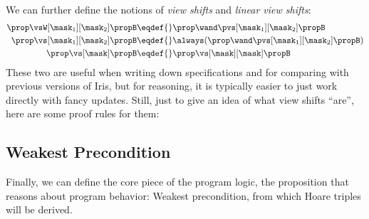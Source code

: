 We can further define the notions of \emph{view shifts} and \emph{linear view shifts}:
\begin{align*}
  \prop \vsW[\mask_1][\mask_2] \propB \eqdef{}& \prop \wand \pvs[\mask_1][\mask_2] \propB \\
  \prop \vs[\mask_1][\mask_2] \propB \eqdef{}& \always(\prop \wand \pvs[\mask_1][\mask_2] \propB) \\
  \prop \vs[\mask] \propB \eqdef{}& \prop \vs[\mask][\mask] \propB
\end{align*}
These two are useful when writing down specifications and for comparing with previous versions of Iris, but for reasoning, it is typically easier to just work directly with fancy updates.
Still, just to give an idea of what view shifts ``are'', here are some proof rules for them:

\subsection{Weakest Precondition}
\label{sec:weakest-pre}

Finally, we can define the core piece of the program logic, the proposition that reasons about program behavior: Weakest precondition, from which Hoare triples will be derived.

